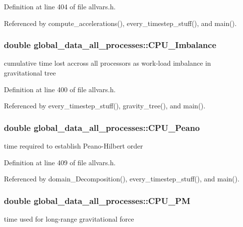 Definition at line 404 of file allvars.h.



Referenced by compute\_\-accelerations(), every\_\-timestep\_\-stuff(), and main().

\hypertarget{structglobal__data__all__processes_a94e4eed16c5b353ec3c3c9ce380ec96a}{
\subsubsection[{CPU\_\-Imbalance}]{\setlength{\rightskip}{0pt plus 5cm}double {\bf global\_\-data\_\-all\_\-processes::CPU\_\-Imbalance}}}
\label{structglobal__data__all__processes_a94e4eed16c5b353ec3c3c9ce380ec96a}
cumulative time lost accross all processors as work-\/load imbalance in gravitational tree 

Definition at line 400 of file allvars.h.



Referenced by every\_\-timestep\_\-stuff(), gravity\_\-tree(), and main().

\hypertarget{structglobal__data__all__processes_a3d1492ec738b3ebf2025de1d2f398b7d}{
\subsubsection[{CPU\_\-Peano}]{\setlength{\rightskip}{0pt plus 5cm}double {\bf global\_\-data\_\-all\_\-processes::CPU\_\-Peano}}}
\label{structglobal__data__all__processes_a3d1492ec738b3ebf2025de1d2f398b7d}
time required to establish Peano-\/Hilbert order 

Definition at line 409 of file allvars.h.



Referenced by domain\_\-Decomposition(), every\_\-timestep\_\-stuff(), and main().

\hypertarget{structglobal__data__all__processes_a2251bf94479cb20a7af9c34ed56587d1}{
\subsubsection[{CPU\_\-PM}]{\setlength{\rightskip}{0pt plus 5cm}double {\bf global\_\-data\_\-all\_\-processes::CPU\_\-PM}}}
\label{structglobal__data__all__processes_a2251bf94479cb20a7af9c34ed56587d1}
time used for long-\/range gravitational force 

